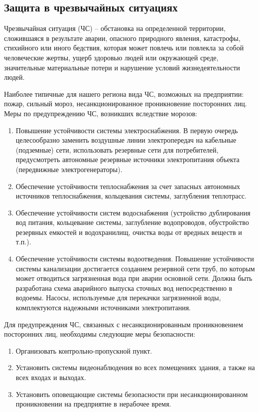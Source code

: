 \subsection{Защита в чрезвычайных ситуациях}

Чрезвычайная ситуация (ЧС) -- обстановка на определенной территории, сложившаяся в результате аварии, опасного природного явления, катастрофы, стихийного или иного бедствия, которая может повлечь или повлекла за собой человеческие жертвы, ущерб здоровью людей или окружающей среде, значительные материальные потери и нарушение условий жизнедеятельности людей.

Наиболее типичные для нашего региона вида ЧС, возможных на предприятии: пожар, сильный мороз, несанкционированное проникновение посторонних лиц.
Меры по предупреждению ЧС, возникших вследствие морозов: 
\begin{enumerate}
[leftmargin=0pt,itemindent=\parindent+\labelwidth+\labelsep]
    \item Повышение устойчивости системы электроснабжения. В первую очередь целесообразно заменить воздушные линии электропередач на кабельные (подземные) сети, использовать резервные сети для потребителей, предусмотреть автономные резервные источники электропитания объекта (передвижные электрогенераторы).
    \item Обеспечение устойчивости теплоснабжения за счет запасных автономных источников теплоснабжения, кольцевания системы, заглубления теплотрасс.
    \item Обеспечение устойчивости систем водоснабжения (устройство дублирования вод питания, кольцевание системы, заглубление водопроводов, обустройство резервных емкостей и водохранилищ, очистка воды от вредных веществ и т.п.).
    \item Обеспечение устойчивости системы водоотведения. 
    Повышение устойчивости системы канализации достигается созданием резервной сети труб, по которым может отводиться загрязненная вода при аварии основной сети. 
    Должна быть разработана схема аварийного выпуска сточных вод непосредственно в водоемы. Насосы, используемые для перекачки загрязненной воды, комплектуются надежными источниками электропитания.
\end{enumerate}

Для предупреждения ЧС, связанных с несанкционированным проникновением посторонних лиц, необходимы следующие меры безопасности: 
\begin{enumerate}
    \item Организовать контрольно-пропускной пункт.
    \item Установить системы видеонаблюдения во всех помещениях здания, а также на всех входах и выходах.
    \item Установить оповещающие системы безопасности при несанкционированном проникновении на предприятие в нерабочее время.
\end{enumerate}

